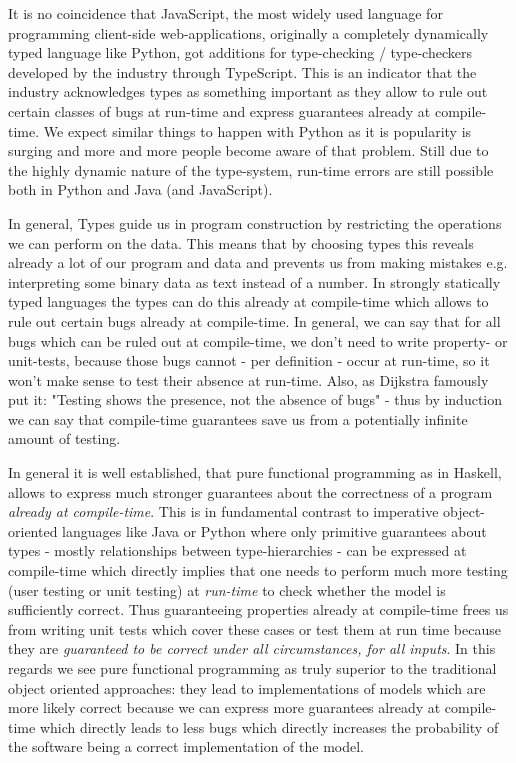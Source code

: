 It is no coincidence that JavaScript, the most widely used language for programming client-side web-applications, originally a completely dynamically typed language like Python, got additions for type-checking / type-checkers developed by the industry through TypeScript. This is an indicator that the industry acknowledges types as something important as they allow to rule out certain classes of bugs at run-time and express guarantees already at compile-time. We expect similar things to happen with Python as it is popularity is surging and more and more people become aware of that problem. Still due to the highly dynamic nature of the type-system, run-time errors are still possible both in Python and Java (and JavaScript). 

In general, Types guide us in program construction by restricting the operations we can perform on the data. This means that by choosing types this reveals already a lot of our program and data and prevents us from making mistakes e.g. interpreting some binary data as text instead of a number. In strongly statically typed languages the types can do this already at compile-time which allows to rule out certain bugs already at compile-time. In general, we can say that for all bugs which can be ruled out at compile-time, we don't need to write property- or unit-tests, because those bugs cannot - per definition - occur at run-time, so it won't make sense to test their absence at run-time. Also, as Dijkstra famously put it: "Testing shows the presence, not the absence of bugs" - thus by induction we can say that compile-time guarantees save us from a potentially infinite amount of testing.

In general it is well established, that pure functional programming as in Haskell, allows to express much stronger guarantees about the correctness of a program \textit{already at compile-time}. This is in fundamental contrast to imperative object-oriented languages like Java or Python where only primitive guarantees about types - mostly relationships between type-hierarchies - can be expressed at compile-time which directly implies that one needs to perform much more testing (user testing or unit testing) at \textit{run-time} to check whether the model is sufficiently correct. Thus guaranteeing properties already at compile-time frees us from writing unit tests which cover these cases or test them at run time because they are \textit{guaranteed to be correct under all circumstances, for all inputs}. In this regards we see pure functional programming as truly superior to the traditional object oriented approaches: they lead to implementations of models which are more likely correct because we can express more guarantees already at compile-time which directly leads to less bugs which directly increases the probability of the software being a correct implementation of the model.

